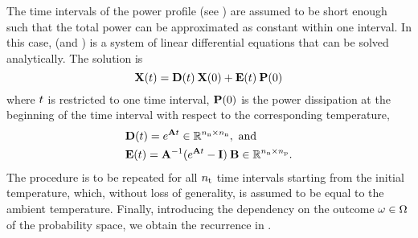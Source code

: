 The time intervals of the power profile (see ) are assumed to be short enough such that the total power can be approximated as constant within one interval.
In this case,  (and ) is a system of linear differential equations that can be solved analytically.
The solution is \cite{ukhov2012}
\begin{equation} \elabel{ode-solution}
  \vX(\t) = \mCF(\t) \: \vX(0) + \mCS(\t) \: \vP(0)
\end{equation}
where $t$ is restricted to one time interval, $\mathbf{P}(0)$ is the power dissipation at the beginning of the time interval with respect to the corresponding temperature,
\begin{align*}
  & \mCF(\t) = e^{\mA \t} \in \real^{\nnodes \times \nnodes}, \text{ and} \\
  & \mCS(\t) = \mA^{-1} (e^{\mA \t} - \mI) \: \mB \in \real^{\nnodes \times \nprocs}.
\end{align*}
The procedure is to be repeated for all ${n_\text{t}}$ time intervals starting from the initial temperature, which, without loss of generality, is assumed to be equal to the ambient temperature.
Finally, introducing the dependency on the outcome $\omega \in \Omega$ of the probability space, we obtain the recurrence in .
